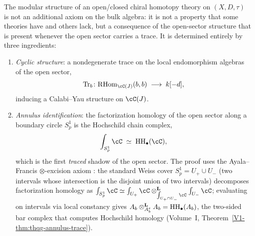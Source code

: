 \begin{principle}
\label{princ:modular-trace}
The modular structure of an open/closed chiral homotopy theory
on $(X,D,\tau)$ is not an additional axiom on the bulk algebra:
it is not a property that some theories have and others lack, but
a consequence of the open-sector structure that is present whenever
the open sector carries a trace.
It is determined entirely by three ingredients:
\begin{enumerate}[label=\textup{(\roman*)}]
\item \emph{Cyclic structure}: a nondegenerate trace on the
 local endomorphism algebras of the open sector,
 \[
 \operatorname{Tr}_b \colon
 \RHom_{\cC(J)}(b,b) \;\longrightarrow\; k[-d],
 \]
 inducing a Calabi--Yau structure on $\cC(J)$.

\item \emph{Annulus identification}: the factorization homology
 of the open sector along a boundary circle $S^1_p$ is the
 Hochschild chain complex,
 \[
 \int_{S^1_p} \cC \;\simeq\; \HH_\bullet(\cC),
 \]
 which is the first \emph{traced} shadow of the open sector.
 The proof uses the Ayala--Francis $\otimes$-excision axiom
 \cite{AF15}: the standard Weiss cover $S^1_p = U_+ \cup U_-$
 \textup{(}two intervals whose intersection is the disjoint
 union of two intervals\textup{)} decomposes factorization
 homology as
 $\int_{S^1_p} \cC \simeq
 \int_{U_+} \cC \otimes^{\mathbf{L}}_{\int_{U_+ \cap U_-} \cC}
 \int_{U_-} \cC$;
 evaluating on intervals via local constancy gives
 $A_b \otimes^{\mathbf{L}}_{A_b^e} A_b = \operatorname{HH}_\bullet(A_b)$,
 the two-sided bar complex that computes Hochschild homology
 \textup{(}Volume~I,
 Theorem~\ref*{V1-thm:thqg-annulus-trace}\textup{)}.


\end{enumerate}
\end{principle}
